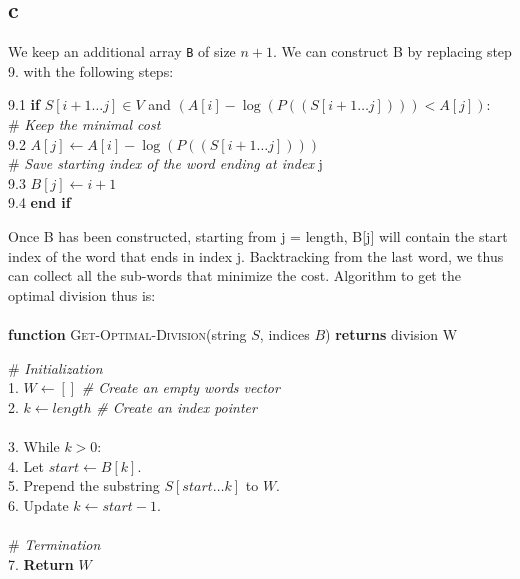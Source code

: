 \documentclass{article}
\numberwithin{equation}{section}
\begin{document}
    \subsection*{c}
    We keep an additional array \texttt{B} of size $n + 1$.
    We can construct B by replacing step 9. with the following steps:
    \begin{tabbing}
        9.1 \quad \textbf{if} $S[i+1 \dots j] \in V$ and $(A[i] - \log(P((S[i + 1 \dots j]))) < A[j])$: \\
        \quad\quad\quad\quad \# \textit{Keep the minimal cost} \\
        9.2 \quad\quad $A[j] \leftarrow A[i] - \log(P((S[i + 1 \dots j])))$ \\
        \quad\quad\quad\quad \# \textit{Save starting index of the word ending at index }j \\
        9.3 \quad\quad $B[j] \leftarrow i + 1$ \\
        9.4 \quad \textbf{end if}
    \end{tabbing}
    Once B has been constructed, starting from j = length, B[j] will contain the start index of the word that ends in index j.
    Backtracking from the last word, we thus can collect all the sub-words that minimize the cost.
    Algorithm to get the optimal division thus is:\\
    \\
    \textbf{function} \textsc{Get-Optimal-Division}(string $S$, indices $B$) \textbf{returns} division W
    \begin{tabbing}
        \quad \# \textit{Initialization} \\
        1. \quad $W \leftarrow []$ \textit{\# Create an empty words vector } \\
        2. \quad $k \leftarrow length$ \textit {\# Create an index pointer}  \\
        \\
        3. \quad While $k > 0$: \\
        4. \quad\quad Let $start \leftarrow B[k]$. \\
        5. \quad\quad Prepend the substring $S[start \dots k]$ to $W$. \\
        6. \quad\quad Update $k \leftarrow start - 1$. \\
        \\
        \quad \# \textit{Termination} \\
        7. \quad \textbf{Return} $W$
    \end{tabbing}
\end{document}
